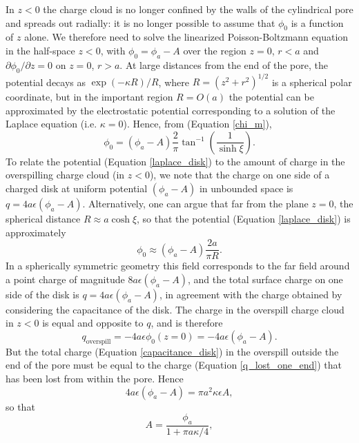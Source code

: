 In $z<0$ the charge
cloud is no longer confined by the walls of the cylindrical pore
and spreads out radially: it is no longer possible to assume that
$\phi_0$ is a function of $z$ alone. 
We therefore need to solve the linearized Poisson-Boltzmann equation in the half-space $z<0$,
with $\phi_0=\phi_a-A$ over the region $z=0$, $r<a$ and
$\partial\phi_0/\partial z=0$ on $z=0$, $r>a$. At large distances from the
end of the pore, the potential decays as $\exp(-\kappa R)/R$,
where $R=(z^2+r^2)^{1/2}$ is a spherical polar coordinate,
but in the important region $R=O(a)$ the potential can be approximated by
the electrostatic potential corresponding to a solution of the Laplace
equation (i.e. $\kappa=0$). Hence, from (Equation \ref{chi_m}),
\begin{equation}
\phi_0=(\phi_a-A)\frac{2}{\pi}\tan^{-1}\left(\frac{1}{\sinh\xi}\right).
\label{laplace_disk}
\end{equation}
To relate the potential (Equation \ref{laplace_disk}) to the amount of charge
in the overspilling charge cloud (in $z<0$), we note that
the charge on one side of a charged disk at uniform potential
$(\phi_a-A)$ in unbounded space is 
$q=4a\epsilon(\phi_a-A)$.
Alternatively, one can argue that
far from the plane $z=0$, the spherical distance $R\approx a\cosh\xi$,
so that the potential (Equation \ref{laplace_disk}) is approximately
\begin{equation}
\phi_0\approx (\phi_a-A)\frac{2a}{\pi R}.
\end{equation}
In a spherically symmetric geometry this field corresponds to the far
field around a point charge of magnitude $8a\epsilon(\phi_a-A)$,
and the total surface charge on one side of the disk is 
$q=4a\epsilon(\phi_a-A)$, in agreement with the charge obtained by considering
the capacitance of the disk. The charge in the overspill charge cloud in $z<0$
is equal and opposite to $q$, and is therefore
\begin{equation}
q_\text{overspill}=-4a\epsilon\phi_0(z=0)=-4a\epsilon(\phi_a-A).
\label{capacitance_disk}
\end{equation}
But the total charge (Equation \ref{capacitance_disk}) in the overspill
outside the end of the pore must be
equal to the charge (Equation \ref{q_lost_one_end})
that has been lost from within the pore.
Hence
\begin{equation}
4a\epsilon(\phi_a-A)=\pi a^2\kappa\epsilon A,
\end{equation}
so that
\begin{equation}
A=\frac{\phi_a}{1+\pi a\kappa/4},
\end{equation}
